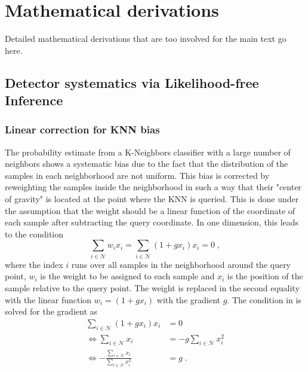 \chapter{Mathematical derivations}
\label{ch:derivations}

Detailed mathematical derivations that are too involved for the main text go here.


\section{Detector systematics via Likelihood-free Inference}

\subsection{Linear correction for KNN bias}
\label{apx:knn-correction}
The probability estimate from a K-Neighbors classifier with a large number of neighbors shows a systematic bias due to the fact that the distribution of the samples in each neighborhood are not uniform.
This bias is corrected by reweighting the samples inside the neighborhood in such a way that their "center of gravity" is located at the point where the KNN is queried.
This is done under the assumption that the weight should be a linear function of the coordinate of each sample after subtracting the query coordinate. In one dimension, this leads to the condition
\begin{equation}
    \sum_{i\in \mathcal{N}} w_i x_i = \sum_{i\in \mathcal{N}} (1 + gx_i) x_i = 0\;,\label{eq:knn-correction-condition}
\end{equation}
where the index $i$ runs over all samples in the neighborhood around the query point, $w_i$ is the weight to be assigned to each sample and $x_i$ is the position of the sample relative to the query point.
The weight is replaced in the second equality with the linear function $w_i = (1 + gx_i)$ with the gradient $g$.
The condition in  is solved for the gradient as
\begin{equation}
\begin{aligned}
    \sum_{i\in \mathcal{N}} (1 + gx_i) x_i &= 0 \\
    \Leftrightarrow \sum_{i\in \mathcal{N}} x_i &= -g \sum_{i\in \mathcal{N}} x_i^2 \\
    \Leftrightarrow -\frac{\sum_{i\in \mathcal{N}} x_i}{\sum_{i\in \mathcal{N}} x_i^2} &= g\;.
\end{aligned}
\end{equation}
